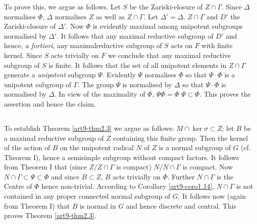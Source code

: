 To prove this, we argue as follows. Let $S$ be the Zariski-elosure of $Z \cap \Gamma$. Since $\Delta$ normalises $\Phi$, $\Delta$ normalises $Z$ as well as $Z \cap \Gamma$. Let $\Delta' = \Delta$. $Z \cap \Gamma$ and $D'$ the Zariski-closure of $\Delta'$. Now $\Phi$ is evidently maximal among unipotent subgroups normalised by $\Delta'$. It follows that any maximal reductive subgroup of $D'$ and hence, \textit{a fortiori}, any maximal\pageoriginale reductive subgroup of $S$ acts on $F$ with finite kernel. Since $S$ acts trivially on $F$ we conclude that any maximal reductive subgroup of $S$ is finite. It follows that the set of all unipotent elements in $Z \cap \Gamma$ generate a \textit{unipotent} subgroup $\Psi$. Evidently $\Psi$ normalises $\Phi$ so that $\Psi \cdot \Phi$ is a unipotent subgroup of $\Gamma$. The group $\Psi$ is normalised by $\Delta$ so that $\Psi \cdot \Phi$ is normalised by $\Delta$. In view of the maximality of $\Phi$, $\Psi \Phi = \Phi$ \ie $\Psi \subset \Phi$. This proves the assertion and hence the claim.

\setcounter{subsection}{5}
\subsection{}\label{art9-subsec2.6}
To establish Theorem \ref{art9-thm2.3} we argue as follows: $M \cap \ker \sigma \subset Z$; let $B$ be a maximal reductive subgroup of $Z$ containing this finite group. Then the kernel of the action of $B$ on the unipotent radical $N$ of $Z$ is a normal subgroup of $G$ (cf. Theorem I), hence a semisimple subgroup without compact factors. It follows from Theorem I that (since $Z/Z \cap \Gamma$ is compact) $N/N \cap \Gamma$ is compact. Now $N \cap \Gamma \subset \Psi \subset \Phi$ and since $B \subset Z$, $B$ acts trivially on $\Phi$. Further $N \cap \Gamma$ is the Centre of $\Phi$ hence non-trivial. According to Corollary \ref{art9-coro1.14}, $N \cap \Gamma$ is not contained in any proper connected normal subgroup of $G$. It follows now (again from Theorem I) that $B$ is normal in $G$ and hence discrete and central. This proves Theorem \ref{art9-thm2.3}.

